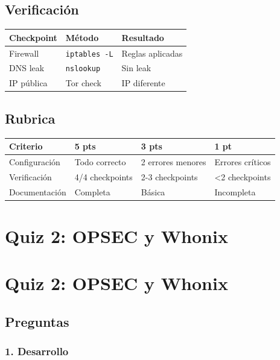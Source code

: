\documentclass[
  letterpaper,
]{report}
\newcounter{none} %
\begin{document}
\section{Verificación}\label{verificaciuxf3n}

{\def\LTcaptype{none} %
\begin{longtable}[]{@{}lll@{}}
\toprule\noalign{}
Checkpoint & Método & Resultado \\
\midrule\noalign{}
\endhead
\bottomrule\noalign{}
\endlastfoot
Firewall & \texttt{iptables\ -L} & Reglas aplicadas \\
DNS leak & \texttt{nslookup} & Sin leak \\
IP pública & Tor check & IP diferente \\
\end{longtable}
}

\section{Rubrica}\label{rubrica}

{\def\LTcaptype{none} %
\begin{longtable}[]{@{}llll@{}}
\toprule\noalign{}
Criterio & 5 pts & 3 pts & 1 pt \\
\midrule\noalign{}
\endhead
\bottomrule\noalign{}
\endlastfoot
Configuración & Todo correcto & 2 errores menores & Errores críticos \\
Verificación & 4/4 checkpoints & 2-3 checkpoints & \textless2
checkpoints \\
Documentación & Completa & Básica & Incompleta \\
\end{longtable}
}

\chapter{Quiz 2: OPSEC y Whonix}\label{quiz-2-opsec-y-whonix}

\chapter{Quiz 2: OPSEC y Whonix}\label{quiz-2-opsec-y-whonix-1}

\section{Preguntas}\label{preguntas-1}

\subsection{1. Desarrollo}\label{desarrollo}
\end{document}
